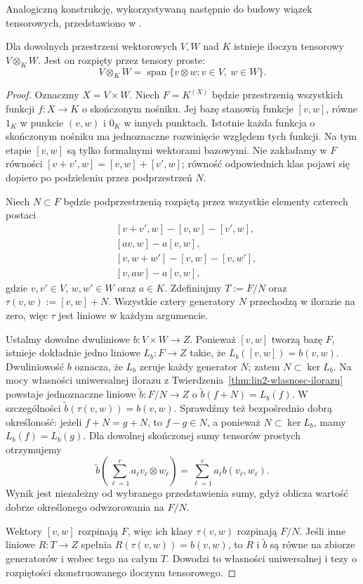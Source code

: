 Analogiczną konstrukcję, wykorzystywaną następnie do budowy wiązek tensorowych, przedstawiono w .

\begin{twierdzenie}
\label{thm:lin10-istnienie}
Dla dowolnych przestrzeni wektorowych
\(V,W\) nad \(K\) istnieje
iloczyn tensorowy \(V\otimes_KW\).
Jest on rozpięty przez tensory proste:
\[
 V\otimes_KW=
 \operatorname{span}
 \{v\otimes w:v\in V,\ w\in W\}.
\]
\end{twierdzenie}
\begin{proof}
Oznaczmy \(X=V\times W\).
Niech \(F=K^{(X)}\) będzie przestrzenią
wszystkich funkcji \(f\colon X\to K\)
o skończonym nośniku.
Jej bazę stanowią funkcje
\([v,w]\), równe \(1_K\) w punkcie
\((v,w)\) i \(0_K\) w innych punktach.
Istotnie każda funkcja o skończonym
nośniku ma jednoznaczne rozwinięcie
względem tych funkcji.
Na tym etapie \([v,w]\) są tylko
formalnymi wektorami bazowymi.
Nie zakładamy w \(F\) równości
\([v+v',w]=[v,w]+[v',w]\);
równość odpowiednich klas
pojawi się dopiero po podzieleniu
przez podprzestrzeń \(N\).

Niech \(N\subset F\) będzie
podprzestrzenią rozpiętą przez
wszystkie elementy czterech postaci
\[
 \begin{aligned}
 &[v+v',w]-[v,w]-[v',w],\\
 &[av,w]-a[v,w],\\
 &[v,w+w']-[v,w]-[v,w'],\\
 &[v,aw]-a[v,w],
 \end{aligned}
\]
gdzie \(v,v'\in V\), \(w,w'\in W\)
oraz \(a\in K\).
Zdefiniujmy
\(T:=F/N\) oraz
\(\tau(v,w):=[v,w]+N\).
Wszystkie cztery generatory \(N\)
przechodzą w ilorazie na zero,
więc \(\tau\) jest liniowe
w każdym argumencie.

Ustalmy dowolne dwuliniowe
\(b\colon V\times W\to Z\).
Ponieważ \([v,w]\) tworzą bazę \(F\),
istnieje dokładnie jedno liniowe
\(L_b\colon F\to Z\) takie, że
\(L_b([v,w])=b(v,w)\).
Dwuliniowość \(b\) oznacza,
że \(L_b\) zeruje każdy generator \(N\);
zatem \(N\subset\ker L_b\).
Na mocy własności uniwersalnej
ilorazu z
Twierdzenia~\ref{thm:lin2-wlasnosc-ilorazu}
powstaje jednoznaczne liniowe
\(\widetilde b\colon F/N\to Z\)
o \(\widetilde b(f+N)=L_b(f)\).
W szczególności
\(\widetilde b(\tau(v,w))=b(v,w)\).
Sprawdźmy też bezpośrednio
dobrą określoność: jeżeli
\(f+N=g+N\), to \(f-g\in N\),
a ponieważ \(N\subset\ker L_b\),
mamy \(L_b(f)=L_b(g)\).
Dla dowolnej skończonej sumy
tensorów prostych otrzymujemy
\[
 \widetilde b\left(
   \sum_{\ell=1}^{r}a_\ell
    v_\ell\otimes w_\ell\right)
 =\sum_{\ell=1}^{r}
     a_\ell b(v_\ell,w_\ell).
\]
Wynik jest niezależny od
wybranego przedstawienia sumy,
gdyż oblicza wartość
dobrze określonego
odwzorowania na \(F/N\).

Wektory \([v,w]\) rozpinają \(F\),
więc ich klasy \(\tau(v,w)\)
rozpinają \(F/N\).
Jeśli inne liniowe \(R\colon T\to Z\)
spełnia \(R(\tau(v,w))=b(v,w)\),
to \(R\) i \(\widetilde b\)
są równe na zbiorze generatorów
i wobec tego na całym \(T\).
Dowodzi to własności uniwersalnej
i tezy o rozpiętości skonstruowanego
iloczynu tensorowego.
\end{proof}

